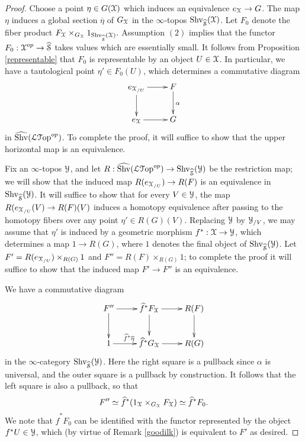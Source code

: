 \begin{proof}
Choose a point $\eta \in G(\operatorname{\mathcal{X}})$ which induces an equivalence $e_{\operatorname{\mathcal{X}}} \rightarrow G$.
The map $\eta$ induces a global section $\overline{\eta}$ of $G_{\operatorname{\mathcal{X}}}$ in the $\infty$-topos
$\operatorname{Shv}_{ \widehat{\operatorname{\mathcal{S}}}}(\operatorname{\mathcal{X}})$. Let $F_0$ denote the fiber product $F_{\operatorname{\mathcal{X}}} \times_{ G_{\operatorname{\mathcal{X}}} } 1_{ \operatorname{Shv}_{ \widehat{\operatorname{\mathcal{S}}}}(\operatorname{\mathcal{X}})}.$
Assumption $(2)$ implies that the functor $F_0: \operatorname{\mathcal{X}}^{op} \rightarrow \widehat{\operatorname{\mathcal{S}}}$
takes values which are essentially small. It follows from Proposition \ref{representable} that
$F_0$ is representable by an object $U \in \operatorname{\mathcal{X}}$. In particular, we have a tautological point
$\eta' \in F_0(U)$, which determines a commutative diagram
$$ \xymatrix{ e_{ \calX_{/U}} \ar[r] \ar[d] & F \ar[d]^{\alpha} \\
e_{\calX} \ar[r] & G }$$
in $\widehat{\operatorname{Shv}}(\operatorname{\mathcal{L}{\mathcal T}op}^{op})$. To complete the proof, it will suffice to show that the upper horizontal map is an equivalence. 

Fix an $\infty$-topos $\operatorname{\mathcal{Y}}$, and let $R: \widehat{\operatorname{Shv}}( \operatorname{\mathcal{L}{\mathcal T}op}^{op} )
\rightarrow \operatorname{Shv}_{ \widehat{\operatorname{\mathcal{S}}}}(\operatorname{\mathcal{Y}})$ be the restriction map; we will show that the induced map
$R( e_{\operatorname{\mathcal{X}}_{/U}}) \rightarrow R(F)$ is an equivalence in $\operatorname{Shv}_{ \widehat{\operatorname{\mathcal{S}}}}(\operatorname{\mathcal{Y}})$. It
will suffice to show that for every $V \in \operatorname{\mathcal{Y}}$, the map
$R(e_{\operatorname{\mathcal{X}}_{/U}}(V) \rightarrow R(F)(V)$ induces a homotopy equivalence after passing
to the homotopy fibers over any point $\eta' \in R(G)(V)$. Replacing $\operatorname{\mathcal{Y}}$ by
$\operatorname{\mathcal{Y}}_{/V}$, we may assume that $\eta'$ is induced by a geometric morphism
$f^{\ast}: \operatorname{\mathcal{X}} \rightarrow \operatorname{\mathcal{Y}}$, which determines a map
$1 \rightarrow R(G)$, where $1$ denotes the final object of $\operatorname{Shv}_{\widehat{\operatorname{\mathcal{S}}}}(\operatorname{\mathcal{Y}})$.
Let $F' = R( e_{\operatorname{\mathcal{X}}_{/U}}) \times_{ R(G)} 1$ and $F'' = R(F) \times_{ R(G) } 1$; to complete the proof it will suffice to show that the induced map $F' \rightarrow F''$ is an equivalence.

We have a commutative diagram
$$ \xymatrix{ F'' \ar[r] \ar[d] & \widehat{f}^{\ast} F_{\calX} \ar[r] \ar[d] & R(F) \ar[d] \\
1 \ar[r]^{ \widehat{f}^{\ast} \overline{\eta} }& \widehat{f}^{\ast} G_{\calX} \ar[r] & R(G) }$$
in the $\infty$-category $\operatorname{Shv}_{ \widehat{\operatorname{\mathcal{S}}}}(\operatorname{\mathcal{Y}})$. Here the right square is a pullback
since $\alpha$ is universal, and the outer square is a pullback by construction.
It follows that the left square is also a pullback, so that 
$$F'' \simeq \widehat{f}^{\ast} (1_{\operatorname{\mathcal{X}}} \times_{ G_{\operatorname{\mathcal{X}}} } F_{\operatorname{\mathcal{X}}})
\simeq \widehat{f}^{\ast} F_0.$$
We note that $\widehat{f}^{\ast} F_0$ can be identified with the functor represented by
the object $f^{\ast} U \in \operatorname{\mathcal{Y}}$, which (by virtue of Remark \ref{goodilk}) is equivalent
to $F'$ as desired. 
\end{proof}

